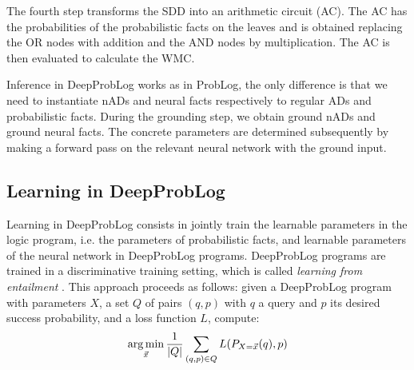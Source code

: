 The fourth step transforms the SDD into an arithmetic circuit (AC). The AC has the probabilities of the probabilistic facts on the leaves and is obtained replacing the OR nodes with addition and the AND nodes by multiplication. The AC is then evaluated to calculate the WMC.

Inference in DeepProbLog works as in ProbLog, the only difference is that we need to instantiate nADs and neural facts respectively to regular ADs and probabilistic facts. During the grounding step, we obtain ground nADs and ground neural facts. The concrete parameters are determined subsequently by making a forward pass on the relevant neural network with the ground input.



\subsection{Learning in DeepProbLog}
Learning in DeepProbLog consists in jointly train the learnable parameters in the logic program, i.e. the parameters of probabilistic facts, and learnable parameters of the neural network in DeepProbLog programs.
DeepProbLog programs are trained in a discriminative training setting, which is called \textit{learning from entailment} \cite{Frazier}. This approach proceeds as follows: given a DeepProbLog program with parameters $X$, a set $Q$ of pairs $(q,p)$ with $q$ a query and $p$ its desired success probability, and a loss function $L$, compute:
\begin{equation}
    \operatorname*{arg\,min}_{\vec{x}} \frac{1}{|Q|} \sum_{(q,p) \in Q} L(P_{X=\vec{x}}(q), p)
\end{equation}

